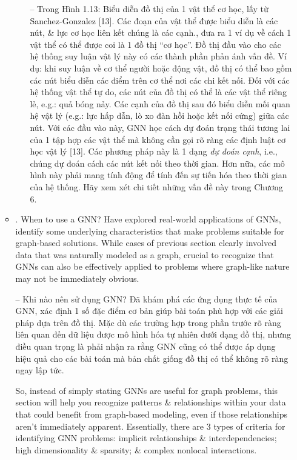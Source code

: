 \documentclass{article}
\begin{document}
\begin{itemize}
\begin{itemize}
\begin{itemize}
            -- Trong {\sf Hình 1.13: Biểu diễn đồ thị của 1 vật thể cơ học, lấy từ Sanchez-Gonzalez [13]. Các đoạn của vật thể được biểu diễn là các nút, \& lực cơ học liên kết chúng là các cạnh.}, đưa ra 1 ví dụ về cách 1 vật thể có thể được coi là 1 đồ thị ``cơ học''. Đồ thị đầu vào cho các hệ thống suy luận vật lý này có các thành phần phản ánh vấn đề. Ví dụ: khi suy luận về cơ thể người hoặc động vật, đồ thị có thể bao gồm các nút biểu diễn các điểm trên cơ thể nơi các chi kết nối. Đối với các hệ thống vật thể tự do, các nút của đồ thị có thể là các vật thể riêng lẻ, e.g.: quả bóng nảy. Các cạnh của đồ thị sau đó biểu diễn mối quan hệ vật lý (e.g.: lực hấp dẫn, lò xo đàn hồi hoặc kết nối cứng) giữa các nút. Với các đầu vào này, GNN học cách dự đoán trạng thái tương lai của 1 tập hợp các vật thể mà không cần gọi rõ ràng các định luật cơ học vật lý [13]. Các phương pháp này là 1 dạng {\it dự đoán cạnh}, i.e., chúng dự đoán cách các nút kết nối theo thời gian. Hơn nữa, các mô hình này phải mang tính động để tính đến sự tiến hóa theo thời gian của hệ thống. Hãy xem xét chi tiết những vấn đề này trong Chương 6.
        \end{itemize}
        \item {. When to use a GNN?} Have explored real-world applications of GNNs, identify some underlying characteristics that make problems suitable for graph-based solutions. While cases of previous section clearly involved data that was naturally modeled as a graph, crucial to recognize that GNNs can also be effectively applied to problems where graph-like nature may not be immediately obvious.

        -- {\sf Khi nào nên sử dụng GNN?} Đã khám phá các ứng dụng thực tế của GNN, xác định 1 số đặc điểm cơ bản giúp bài toán phù hợp với các giải pháp dựa trên đồ thị. Mặc dù các trường hợp trong phần trước rõ ràng liên quan đến dữ liệu được mô hình hóa tự nhiên dưới dạng đồ thị, nhưng điều quan trọng là phải nhận ra rằng GNN cũng có thể được áp dụng hiệu quả cho các bài toán mà bản chất giống đồ thị có thể không rõ ràng ngay lập tức.

        So, instead of simply stating GNNs are useful for graph problems, this section will help you recognize patterns \& relationships within your data that could benefit from graph-based modeling, even if those relationships aren't immediately apparent. Essentially, there are 3 types of criteria for identifying GNN problems: implicit relationships \& interdependencies; high dimensionality \& sparsity; \& complex nonlocal interactions.


\end{itemize}
\end{itemize}
\end{document}
